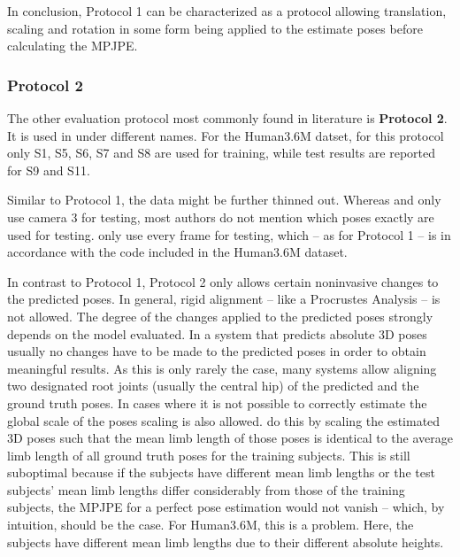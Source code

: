 In conclusion, Protocol 1 can be characterized as a protocol allowing translation, scaling and rotation in some form being applied to the estimate poses before calculating the MPJPE.

\subsubsection{Protocol 2}\label{sec:protocol2}

The other evaluation protocol most commonly found in literature is \textbf{Protocol 2}.
It is used in \cite{sun17, moreno-noguer16, bogo16, martinez17, zhou18, zhou16, tekin16, pavlakos17, sun17} under different names.
For the Human3.6M datset, for this protocol only S1, S5, S6, S7 and S8 are used for training, while test results are reported for S9 and S11.

Similar to Protocol 1, the data might be further thinned out.
Whereas \citet{moreno-noguer16} and \citet{bogo16} only use camera 3 for testing, most authors do not mention which poses exactly are used for testing.
\citet{sun17} only use every  frame for testing, which -- as for Protocol 1 -- is in accordance with the code included in the Human3.6M dataset.


In contrast to Protocol 1, Protocol 2 only allows certain noninvasive changes to the predicted poses.
In general, rigid alignment -- like a Procrustes Analysis -- is not allowed.
The degree of the changes applied to the predicted poses strongly depends on the model evaluated.
In a system that predicts absolute 3D poses usually no changes have to be made to the predicted poses in order to obtain meaningful results.
As this is only rarely the case, many systems \cite{martinez17, zhou18, zhou16, tekin16, pavlakos17} allow aligning two designated root joints (usually the central hip) of the predicted and the ground truth poses.
In cases where it is not possible to correctly estimate the global scale of the poses scaling is also allowed.
\citet{zhou18} do this by scaling the estimated 3D poses such that the mean limb length of those poses is identical to the average limb length of all ground truth poses for the training subjects.
This is still suboptimal because if the subjects have different mean limb lengths or the test subjects' mean limb lengths differ considerably from those of the training subjects, the MPJPE for a perfect pose estimation would not vanish -- which, by intuition, should be the case.
For Human3.6M, this is a problem.
Here, the subjects have different mean limb lengths due to their different absolute heights.

